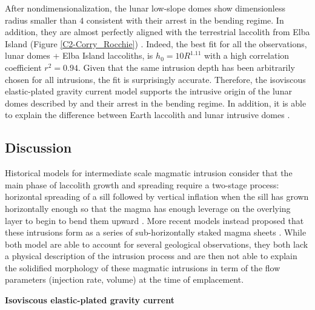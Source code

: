 After   nondimensionalization,   the   lunar  low-slope   domes   show
dimensionless radius smaller than $4$  consistent with their arrest in
the bending  regime. In  addition, they  are almost  perfectly aligned
with   the   terrestrial   laccolith    from   Elba   Island   (Figure
\ref{C2-Corry_Rocchie}) \citep{Michaut:2011kg}.  Indeed,  the best fit
for all  the observations,  lunar domes +  Elba Island  laccoliths, is
$h_0   =    10R^{1.11}$   with   a   high    correlation   coefficient
$r^2=0.94$. Given that  the same intrusion depth  has been arbitrarily
chosen  for   all  intrusions,  the  fit   is  surprisingly  accurate.
Therefore,  the   isoviscous  elastic-plated  gravity   current  model
supports  the  intrusive  origin  of  the  lunar  domes  described  by
\citet{Wohler:2009jj}  and their  arrest  in the  bending regime.   In
addition,  it is able  to explain  the  difference between  Earth
laccolith and lunar intrusive domes \citep{Michaut:2011kg}.

\subsection{Discussion}
\label{C2-sec:discussion-1}

Historical models  for intermediate scale magmatic  intrusion consider
that  the main  phase  of  laccolith growth  and  spreading require  a
two-stage process: horizontal spreading of a sill followed by vertical
inflation  when the  sill has  grown horizontally  enough so  that the
magma has enough leverage on the overlying layer to begin to bend them
upward \citep{Johnson:1973ho,Koch:1981if}.  More recent models instead
proposed that  these intrusions form  as a series  of sub-horizontally
staked magma  sheets \citep{Morgan:2008hj,Menand:2011ki}.   While both
model are  able to account  for several geological  observations, they
both lack a physical description of the intrusion process and are then
not  able  to explain  the  solidified  morphology of  these  magmatic
intrusions in term of the  flow parameters (injection rate, volume) at
the time of emplacement.

\vspace{.5cm}   \textbf{Isoviscous  elastic-plated   gravity  current}
\vspace{.5cm}

